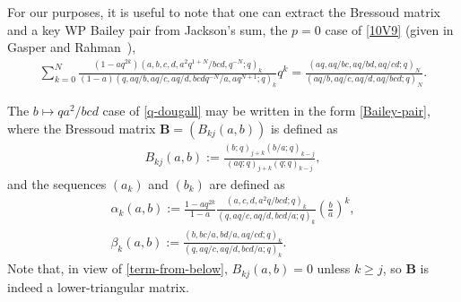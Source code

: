 \documentclass[pdftex]{sigma}
\numberwithin{equation}{section}
\newcommand{\B}{{ \mathbf B}}
\newcommand{\qrfac}[2]{{\left({#1}; q\right)_{#2}}} %
\begin{document}
For our purposes, it is useful to note that one can extract the Bressoud matrix and a key WP Bailey pair from Jackson's sum, the $p=0$ case of \eqref{10V9} (given in Gasper and Rahman~\cite[equation~(2.6.2)]{GR90}),
\begin{gather}\label{q-dougall}
\sum_{k=0}^N\!\frac{(1\!-\!aq^{2k}) \qrfac{ a, b, c, d, a^2q^{1+N}\!/bcd, q^{-N}}{k}}
{(1\!-\!a)\qrfac{q, aq/b, aq/c, aq/d, bcdq^{-N}\!/a, aq^{N+1}}{k}}q^k\!
=\frac{\qrfac{aq, aq/bc, aq/bd, aq/cd}{N}} {\qrfac{aq/b, aq/c, aq/d, aq/bcd}{N}}.\!\!\!\!\!\!
\end{gather}

The $b\mapsto qa^2/bcd$ case of \eqref{q-dougall} may be written in the form \eqref{Bailey-pair}, where the Bressoud matrix $\B= (B_{kj}(a,b))$ is defined as
\begin{gather}
B_{k j}(a,b) := \frac{\qrfac{b}{j+k} \qrfac{b/a}{k-j}} { \qrfac{aq}{j+k}\qrfac{q}{k-j}},\label{Bressoud}
\end{gather}
and the sequences $(a_k)$ and $(b_k)$ are defined as
\begin{subequations}\label{alphabeta}
\begin{gather}
\alpha_k(a,b) := \frac{1-aq^{2k}}{1-a}
\frac{\qrfac{a, c, d, a^2q/bcd}{k} }{\qrfac{q, aq/c, aq/d, bcd/a}{k}}
\left( \frac{b}{a}\right)^{k} ,\label{alpha} \\
\beta_k(a,b) := \frac{\qrfac{b, bc/a, bd/a, aq/cd}{k}}{\qrfac{q, aq/c, aq/d, bcd/a}{k}}.\label{beta}
\end{gather}
\end{subequations}
Note that, in view of \eqref{term-from-below}, $B_{kj}(a,b)=0$ unless $k\geq j$, so $\B$ is indeed a lower-triangular matrix.
\end{document}

